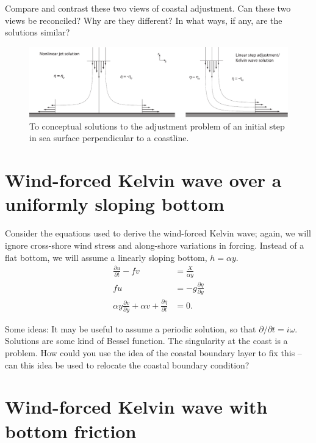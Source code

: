 \documentclass[11pt]{report}
\numberwithin{equation}{section}
\begin{document}
Compare and contrast these two views of coastal adjustment.  Can these two views be reconciled?  Why are they different?  In what ways, if any, are the solutions similar?

\begin{figure}[h]
    \centering
    \includegraphics[width=6.5in]{kelvin-vs-jet_adjustment}
    \caption{To conceptual solutions to the adjustment problem of an initial step in sea surface perpendicular to a coastline.}
    \label{fig:kelvin-vs-jet_adjustment}
\end{figure}

\clearpage

\section{Wind-forced Kelvin wave over a uniformly sloping bottom}
\label{prob:wind_forced_kelvin_wave}

Consider the equations used to derive the wind-forced Kelvin wave; again, we will ignore cross-shore wind stress and along-shore variations in forcing.  Instead of a flat bottom, we will assume a linearly sloping bottom, $h = \alpha y$.
\begin{align}
\frac{\partial u}{\partial t} - fv &=  \frac{X}{\alpha y} \\
    f u &= -g\frac{\partial \eta}{\partial y} \\
    \alpha y \frac{\partial v}{\partial y} + \alpha v + \frac{\partial \eta}{\partial t} &= 0.
\end{align}

Some ideas:  It may be useful to assume a periodic solution, so that $\partial/\partial t = i \omega$.  Solutions are some kind of Bessel function.  The singularity at the coast is a problem.  How could you use the idea of the coastal boundary layer to fix this -- can this idea be used to relocate the coastal boundary condition?

\section{Wind-forced Kelvin wave with bottom friction} 
\label{prob:wind_forced_kelvin_wave_friction}
\end{document}
